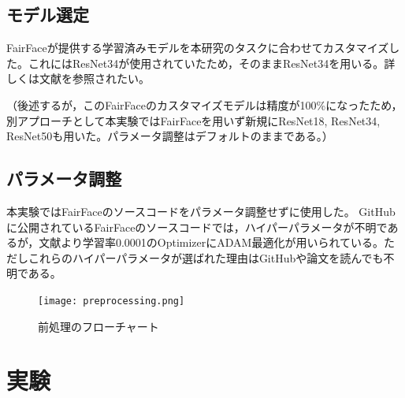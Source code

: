 \documentclass[a4paper,11pt,titlepage]{jsarticle}
\begin{document}
\subsection{モデル選定}
FairFaceが提供する学習済みモデルを本研究のタスクに合わせてカスタマイズした。これにはResNet34が使用されていたため，そのままResNet34を用いる。詳しくは文献\cite{karkkainenFairFace}を参照されたい。\par
（後述するが，このFairFaceのカスタマイズモデルは精度が100\%になったため，別アプローチとして本実験ではFairFaceを用いず新規にResNet18, ResNet34, ResNet50も用いた。パラメータ調整はデフォルトのままである。）


\subsection{パラメータ調整}
本実験ではFairFaceのソースコードをパラメータ調整せずに使用した。
GitHubに公開されているFairFaceのソースコードでは，ハイパーパラメータが不明であるが，文献\cite{karkkainenFairFace}より学習率0.0001のOptimizerにADAM最適化が用いられている。ただしこれらのハイパーパラメータが選ばれた理由はGitHubや論文を読んでも不明である。


\begin{figure}[H]
    \centering
    \texttt{[image: preprocessing.png]}
    \caption{前処理のフローチャート}
    \label{fig:prepro}
\end{figure}




\section{実験}
\label{実験}
\end{document}
